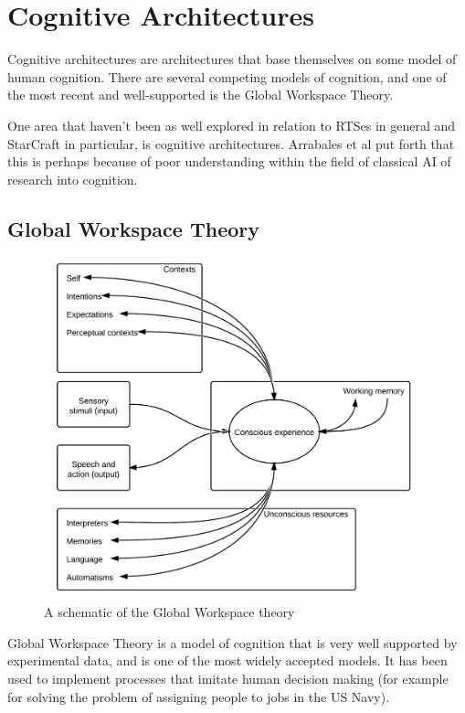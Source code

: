 \section{Cognitive Architectures}
\label{sec:cogarch}
Cognitive architectures are architectures that base themselves on some model of
human cognition. There are several competing models of cognition, and one of
the most recent and well-supported is the Global Workspace Theory.

One area that haven't been as well explored in relation to RTSes in general and
StarCraft in particular, is cognitive architectures. Arrabales et al put forth
that this is perhaps because of poor understanding within the field of classical
AI of research into cognition\cite{arrabales2009gamechars}.

\subsection{Global Workspace Theory}

\begin{figure}[h!tb]
\centering
\includegraphics[scale=1.0]{graphics/globalworkspace.png}
\caption{A schematic of the Global Workspace theory\cite{baars2005gwt}}
\label{fig:gwt}
\end{figure}

Global Workspace Theory is a model of cognition that is very well supported by
experimental data, and is one of the most widely accepted
models.\cite{dehaene2001towards} It has been used to implement processes that
imitate human decision making (for example for solving the problem of assigning
people to jobs in the US Navy).\cite{baars2005gwt}\cite{franklin2003interacting}

